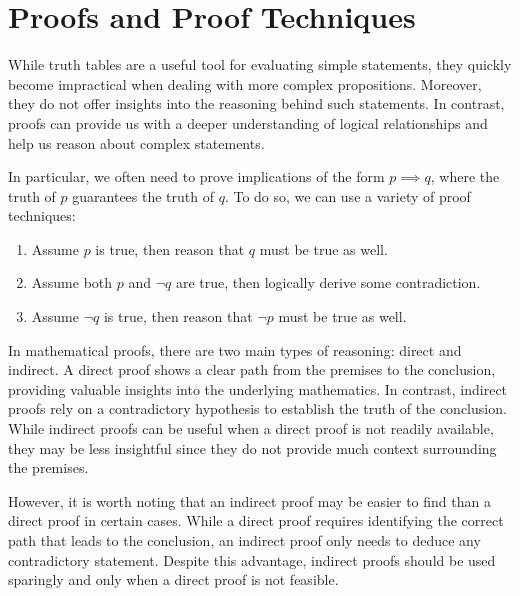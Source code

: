 

\section{Proofs and Proof Techniques}
While truth tables are a useful tool for evaluating simple statements, they quickly become impractical when dealing with more complex propositions. Moreover, they do not offer insights into the reasoning behind such statements. In contrast, proofs can provide us with a deeper understanding of logical relationships and help us reason about complex statements.

In particular, we often need to prove implications of the form $p \implies q$, where the truth of $p$ guarantees the truth of $q$. To do so, we can use a variety of proof techniques:
\begin{enumerate}
    \item {} Assume $p$ is true, then reason that $q$ must be true as well.
    \item {} Assume both $p$ and $\neg q$ are true, then logically derive some contradiction.
    \item {} Assume $\neg q$ is true, then reason that $\neg p$ must be true as well.
\end{enumerate}

In mathematical proofs, there are two main types of reasoning: direct and indirect. A direct proof shows a clear path from the premises to the conclusion, providing valuable insights into the underlying mathematics. In contrast, indirect proofs rely on a contradictory hypothesis to establish the truth of the conclusion. While indirect proofs can be useful when a direct proof is not readily available, they may be less insightful since they do not provide much context surrounding the premises.

However, it is worth noting that an indirect proof may be easier to find than a direct proof in certain cases. While a direct proof requires identifying the correct path that leads to the conclusion, an indirect proof only needs to deduce any contradictory statement. Despite this advantage, indirect proofs should be used sparingly and only when a direct proof is not feasible.


